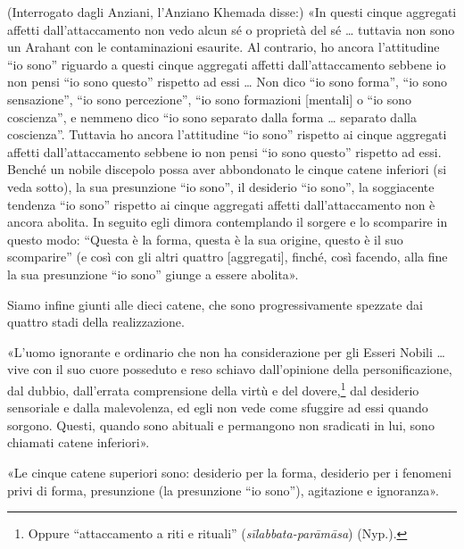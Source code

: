 

(Interrogato dagli Anziani, l’Anziano Khemada disse:) «In questi cinque
aggregati affetti dall’attaccamento non vedo alcun sé o proprietà del sé
… tuttavia non sono un Arahant con le contaminazioni esaurite. Al
contrario, ho ancora l’attitudine “io sono” riguardo a questi cinque
aggregati affetti dall’attaccamento sebbene io non pensi “io sono
questo” rispetto ad essi … Non dico “io sono forma”, “io sono
sensazione”, “io sono percezione”, “io sono formazioni [mentali] o “io
sono coscienza”, e nemmeno dico “io sono separato dalla forma … separato
dalla coscienza”. Tuttavia ho ancora l’attitudine “io sono” rispetto ai
cinque aggregati affetti dall’attaccamento sebbene io non pensi “io sono
questo” rispetto ad essi. Benché un nobile discepolo possa aver
abbondonato le cinque catene inferiori (si veda sotto), la sua
presunzione “io sono”, il desiderio “io sono”, la soggiacente tendenza
“io sono” rispetto ai cinque aggregati affetti dall’attaccamento non è
ancora abolita. In seguito egli dimora contemplando il sorgere e lo
scomparire in questo modo: “Questa è la forma, questa è la sua origine,
questo è il suo scomparire” (e così con gli altri quattro [aggregati],
finché, così facendo, alla fine la sua presunzione “io sono” giunge a
essere abolita».




 Siamo infine giunti alle dieci catene, che sono
progressivamente spezzate dai quattro stadi della realizzazione.


 «L’uomo ignorante e ordinario che non ha considerazione per
gli Esseri Nobili … vive con il suo cuore posseduto e reso schiavo
dall’opinione della personificazione, dal dubbio, dall’errata
comprensione della virtù e del dovere,\footnote{Oppure “attaccamento a riti e rituali” (\emph{sīlabbata-parāmāsa}) (Nyp.).} dal desiderio
sensoriale e dalla malevolenza, ed egli non vede come sfuggire ad essi
quando sorgono. Questi, quando sono abituali e permangono non sradicati
in lui, sono chiamati catene inferiori».




«Le cinque catene superiori sono: desiderio per la forma, desiderio per
i fenomeni privi di forma, presunzione (la presunzione “io sono”),
agitazione e ignoranza».




